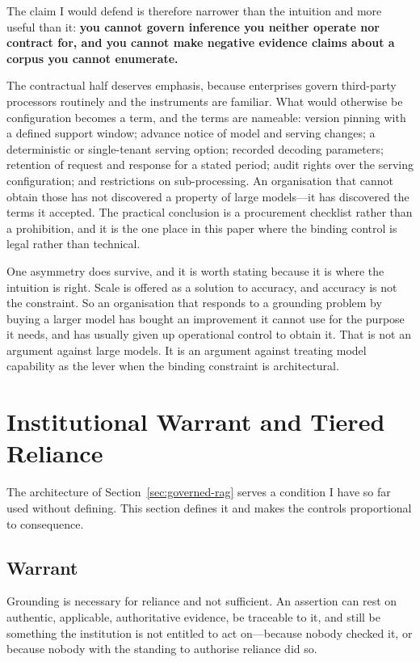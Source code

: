 \documentclass[11pt]{article}
\theoremstyle{plain}
\theoremstyle{definition}
\begin{document}
The claim I would defend is therefore narrower than the intuition and more useful
than it: \textbf{you cannot govern inference you neither operate nor contract for, and
you cannot make negative evidence claims about a corpus you cannot enumerate.}

The contractual half deserves emphasis, because enterprises govern third-party
processors routinely and the instruments are familiar. What would otherwise be
configuration becomes a term, and the terms are nameable: version pinning with a
defined support window; advance notice of model and serving changes; a deterministic or
single-tenant serving option; recorded decoding parameters; retention of request and
response for a stated period; audit rights over the serving configuration; and
restrictions on sub-processing. An organisation that cannot obtain those has not
discovered a property of large models---it has discovered the terms it accepted. The
practical conclusion is a procurement checklist rather than a prohibition, and it is
the one place in this paper where the binding control is legal rather than technical.

One asymmetry does survive, and it is worth stating because it is where the intuition
is right. Scale is offered as a solution to accuracy, and accuracy is not the
constraint. So an organisation that responds to a grounding problem by buying a larger
model has bought an improvement it cannot use for the purpose it needs, and has
usually given up operational control to obtain it. That is not an argument against
large models. It is an argument against treating model capability as the lever when
the binding constraint is architectural.


\section{Institutional Warrant and Tiered Reliance}
\label{sec:tiers}

The architecture of Section~\ref{sec:governed-rag} serves a condition I have so far
used without defining. This section defines it and makes the controls proportional
to consequence.

\subsection{Warrant}

Grounding is necessary for reliance and not sufficient. An assertion can rest on
authentic, applicable, authoritative evidence, be traceable to it, and still be
something the institution is not entitled to act on---because nobody checked it, or
because nobody with the standing to authorise reliance did so.
\end{document}
